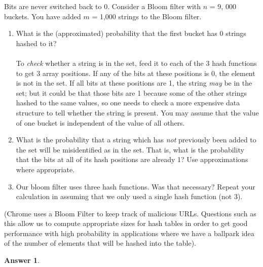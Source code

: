 \documentclass[12pt]{article}
\renewcommand{\(}{\left(}
\renewcommand{\)}{\right)}
\theoremstyle{definition}
\newtheorem*{answer}{Answer}
\begin{document}
\begin{enumerate}
{    Bits are never switched back to 0. Consider a Bloom filter with $n$ = 9, 000 buckets. You have added $m$ = 1,000 strings to the Bloom filter.
    \begin{enumerate}
        \item What is the (approximated) probability that the first bucket has 0 strings hashed to it?\\ \\
        \setcounter{enumii}{2}
        To \textit{check} whether a string is in the set, feed it to each of the 3 hash functions to get 3 array positions. If any of the bits at these positions is 0, the element is not in the set. If all bits at these positions are 1, the string \textit{may} be in the set; but it could be that those bits are 1 because some of the other strings hashed to the same values, so one needs to check a more expensive data structure to tell whether the string is present. You may assume that the value of one bucket is independent of the value of all others.\\
        \item What is the probability that a string which has \textit{not} previously been added to the set will be misidentified as in the set. That is, what is the probability that the bits at all of its hash positions are already 1? Use approximations where appropriate.
        \item Our bloom filter uses three hash functions. Was that necessary? Repeat your calculation in assuming that we only used a single hash function (not 3).
    \end{enumerate}
    
    (Chrome uses a Bloom Filter to keep track of malicious URLs. Questions such as this allow us to compute appropriate sizes for hash tables in order to get good performance with high probability in applications where we have a ballpark idea of the number of elements that will be hashed into the table).
    
    \begin{shaded}
    \begin{answer}
    

\end{answer}
\end{shaded}}
\end{enumerate}
\end{document}
